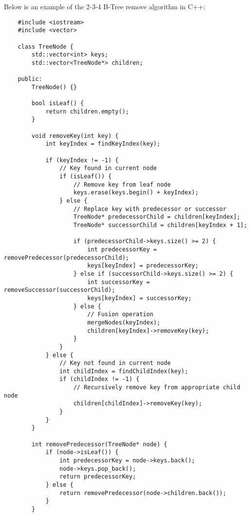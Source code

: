 \begin{solution}
    Below is an example of the 2-3-4 B-Tree remove algorithm in C++:
    
    \horizontalline

    \begin{verbatim}
    #include <iostream>
    #include <vector>
    
    class TreeNode {
        std::vector<int> keys;
        std::vector<TreeNode*> children;
    
    public:
        TreeNode() {}
    
        bool isLeaf() {
            return children.empty();
        }
    
        void removeKey(int key) {
            int keyIndex = findKeyIndex(key);
    
            if (keyIndex != -1) {
                // Key found in current node
                if (isLeaf()) {
                    // Remove key from leaf node
                    keys.erase(keys.begin() + keyIndex);
                } else {
                    // Replace key with predecessor or successor
                    TreeNode* predecessorChild = children[keyIndex];
                    TreeNode* successorChild = children[keyIndex + 1];
    
                    if (predecessorChild->keys.size() >= 2) {
                        int predecessorKey = removePredecessor(predecessorChild);
                        keys[keyIndex] = predecessorKey;
                    } else if (successorChild->keys.size() >= 2) {
                        int successorKey = removeSuccessor(successorChild);
                        keys[keyIndex] = successorKey;
                    } else {
                        // Fusion operation
                        mergeNodes(keyIndex);
                        children[keyIndex]->removeKey(key);
                    }
                }
            } else {
                // Key not found in current node
                int childIndex = findChildIndex(key);
                if (childIndex != -1) {
                    // Recursively remove key from appropriate child node
                    children[childIndex]->removeKey(key);
                }
            }
        }
    
        int removePredecessor(TreeNode* node) {
            if (node->isLeaf()) {
                int predecessorKey = node->keys.back();
                node->keys.pop_back();
                return predecessorKey;
            } else {
                return removePredecessor(node->children.back());
            }
        }
    

\end{verbatim}
\end{solution}
